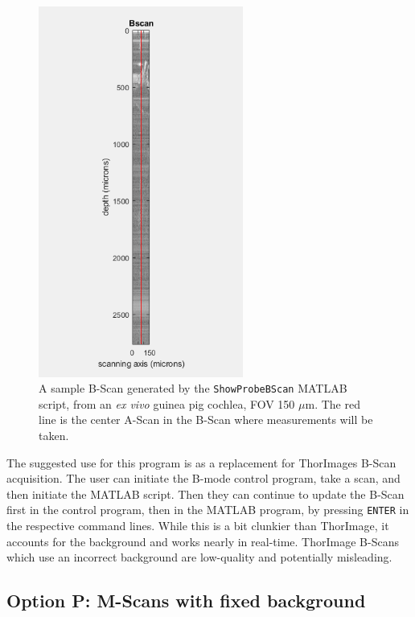 \documentclass{article}
\begin{document}
\begin{figure}[!h]\label{bex}
	\centering
	\includegraphics[width=0.6\textwidth]{Data for Probe Writeup/BScan fig update.png}
	\caption{A sample B-Scan generated by the \texttt{ShowProbeBScan} MATLAB script, from an \textit{ex vivo} guinea pig cochlea, FOV 150 $\mu$m. The red line is the center A-Scan in the B-Scan where measurements will be taken.}
\end{figure}

\par{The suggested use for this program is as a replacement for ThorImages B-Scan acquisition. The user can initiate the B-mode control program, take a scan, and then initiate the MATLAB script. Then they can continue to update the B-Scan first in the control program, then in the MATLAB program, by pressing \texttt{ENTER} in the respective command lines. While this is a bit clunkier than ThorImage, it accounts for the background and works nearly in real-time. ThorImage B-Scans which use an incorrect background are low-quality and potentially misleading.}

\subsection{Option P: M-Scans with fixed background}
\end{document}
